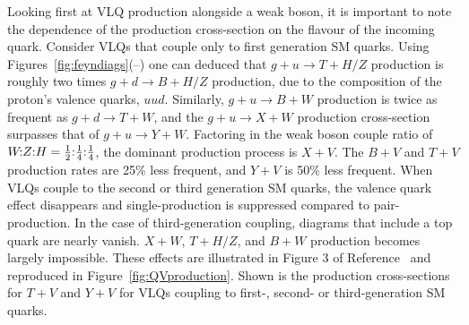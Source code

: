 Looking first at VLQ production alongside a weak boson, it is important to note the dependence of the production cross-section on the flavour of the incoming quark. Consider VLQs that couple only to first generation SM quarks. Using Figures~\ref{fig:feyndiags}(--) one can deduced that $g + u \rightarrow T+H/Z$ production is roughly two times $g + d \rightarrow B+H/Z$ production, due to the composition of the proton's valence quarks, $uud$. Similarly, $g + u \rightarrow B+W$ production is twice as frequent as  $g + d \rightarrow T+W$, and the $g + u \rightarrow X+W$ production cross-section surpasses that of $g + u \rightarrow Y+W$. Factoring in the weak boson couple ratio of  $\text{$W\!$:$Z$:$H$} = \text{$\tfrac{1}{2}$:$\tfrac{1}{4}$:$\tfrac{1}{4}$}$, the dominant production process is $X+V$. The $B+V$ and $T+V$ production rates are 25\% less frequent, and $Y+V$ is 50\% less frequent. When VLQs couple to the second or third generation SM quarks, the valence quark effect disappears and single-production is suppressed compared to pair-production. In the case of third-generation coupling, diagrams that include a top quark are nearly vanish. $X+W$, $T+H/Z$, and $B+W$ production becomes largely impossible. These effects are illustrated in Figure 3 of Reference~\cite{VLQ_contur} and reproduced in Figure~\ref{fig:QVproduction}. Shown is the production cross-sections for $T+V$ and $Y+V$ for VLQs coupling to first-, second- or third-generation SM quarks. 

